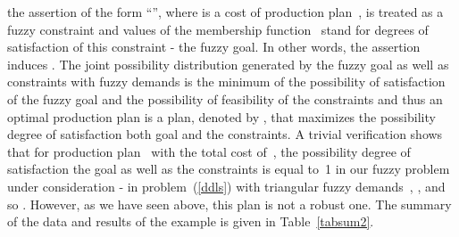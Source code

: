 \documentclass[11pt]{article}
\begin{document}
the assertion of the form ``'', 
where  is a cost of production plan~, 
is treated as a fuzzy constraint and  values of the membership function~
stand for
degrees of satisfaction of this constraint - the fuzzy goal. In other words, the assertion induces 
.
The joint possibility distribution generated  by the fuzzy goal as well as constraints with fuzzy demands
is the minimum of the possibility of satisfaction of the fuzzy goal and the possibility of
feasibility of the constraints and thus an optimal production plan is a plan, denoted by ,
that maximizes the possibility degree of satisfaction both  goal and the constraints.
A trivial verification shows that for    production
plan~  with  the total cost of~,
the possibility degree of satisfaction the goal as well as the constraints
is equal to~1  in our fuzzy problem under consideration -
in problem~(\ref{ddls}) with triangular fuzzy demands~,
 ,  and so .
 However, as we have seen above, this plan is not a robust one.
 The summary of the data and results of the example is given in Table~\ref{tabsum2}.
 
 
 
\end{document}
